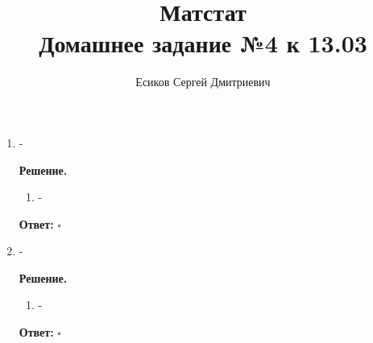 \documentclass[12pt]{article}
\title{\textbf{Матстат}\\Домашнее задание №4 к 13.03}
\author{Есиков Сергей Дмитриевич}
\newenvironment{solution}{\textbf{Решение.}\par}{\hfill\(\square\)}
\newcommand{\answer}[1]{\textbf{Ответ:} \boxed{#1}}
\begin{document}
\maketitle

\begin{enumerate}[label=\textbf{\arabic*.}, left=0pt]
    \item -
          
    \begin{solution}
              \begin{enumerate}
                  \item -
              \end{enumerate}
              \answer{-}
          \end{solution}
    
    \item -
          
    \begin{solution}
              \begin{enumerate}
                  \item -
              \end{enumerate}
              \answer{-}
          \end{solution}
\end{enumerate}
\end{document}
